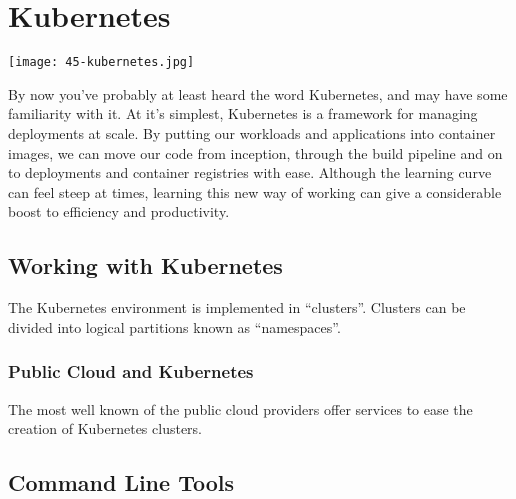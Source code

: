 \chapter{Kubernetes}

\texttt{[image: 45-kubernetes.jpg]}

\justifying
By now you've probably at least heard the word Kubernetes, and may have some familiarity with it. At it's
simplest, Kubernetes is a framework for managing deployments at scale. By putting our
workloads and applications into container images, we can move our code from inception, through the build pipeline
and on to deployments and container registries with ease. Although the learning curve can feel steep at times,
learning this new way of working can give a considerable boost to efficiency and productivity.

\section{Working with Kubernetes}

\justifying
The Kubernetes environment is implemented in ``clusters''. Clusters can be divided into logical partitions known
as ``namespaces''.

\subsection{Public Cloud and Kubernetes}

\justifying
The most well known of the public cloud providers offer services to ease the creation of Kubernetes clusters.

\section{Command Line Tools}

